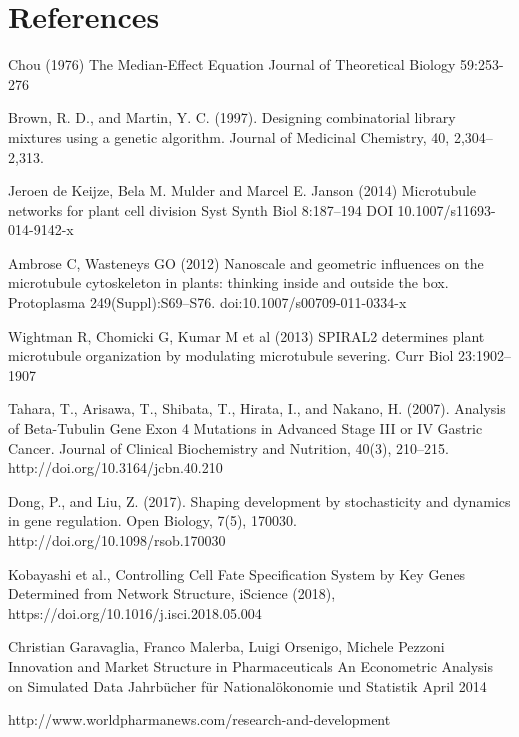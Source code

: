\section{References}

Chou (1976)
\newblock The Median-Effect Equation
\newblock Journal of Theoretical Biology 59:253-276 

Brown, R. D., and Martin, Y. C. (1997). 
\newblock Designing combinatorial library mixtures using a genetic algorithm. 
\newblock Journal of Medicinal Chemistry, 40, 2,304–2,313.

Jeroen de Keijze, Bela M. Mulder and Marcel E. Janson (2014)
\newblock Microtubule networks for plant cell division
\newblock Syst Synth Biol 8:187–194 DOI 10.1007/s11693-014-9142-x

 Ambrose   C,   Wasteneys   GO   (2012)   
\newblock Nanoscale  and  geometric influences  on  the  microtubule  cytoskeleton  in  plants:  thinking inside  and  outside  the  box.  
\newblock Protoplasma  249(Suppl):S69–S76. doi:10.1007/s00709-011-0334-x

 Wightman   R,   Chomicki   G,   Kumar   M   et   al   (2013)   
\newblock SPIRAL2 determines plant microtubule organization by modulating microtubule severing. 
\newblock Curr Biol 23:1902–1907

Tahara, T., Arisawa, T., Shibata, T., Hirata, I., and Nakano, H. (2007). 
\newblock Analysis of Beta-Tubulin Gene Exon 4 Mutations in Advanced Stage III or IV Gastric Cancer. 
\newblock Journal of Clinical Biochemistry and Nutrition, 40(3), 210–215. http://doi.org/10.3164/jcbn.40.210

Dong, P., and Liu, Z. (2017). 
\newblock Shaping development by stochasticity and dynamics in gene regulation. 
\newblock Open Biology, 7(5), 170030. http://doi.org/10.1098/rsob.170030

Kobayashi et al., 
\newblock Controlling Cell Fate Specification System by Key Genes Determined from Network Structure,
\newblock iScience (2018), https://doi.org/10.1016/j.isci.2018.05.004

 Christian Garavaglia, Franco Malerba, Luigi Orsenigo, Michele Pezzoni
\newblock Innovation and Market Structure in Pharmaceuticals An Econometric Analysis on Simulated Data
\newblock Jahrbücher für Nationalökonomie und Statistik  April 2014

 http://www.worldpharmanews.com/research-and-development




